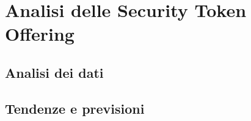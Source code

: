 \chapter{Analisi delle Security Token Offering}     
\section{Analisi dei dati}
\section{Tendenze e previsioni}